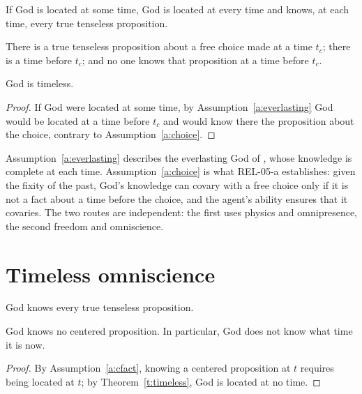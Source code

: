 \documentclass{situationist-preprint}
\begin{document}
\begin{assumption}\label{a:everlasting}
If God is located at some time, God is located at every time and knows, at each time, every true tenseless proposition.
\end{assumption}

\begin{assumption}\label{a:choice}
There is a true tenseless proposition about a free choice made at a time $t_c$; there is a time before $t_c$; and no one knows that proposition at a time before $t_c$.
\end{assumption}

\begin{proposition}\label{p:second}
God is timeless.
\end{proposition}

\begin{proof}
If God were located at some time, by Assumption~\ref{a:everlasting} God would be located at a time before $t_c$ and would know there the proposition about the choice, contrary to Assumption~\ref{a:choice}.
\end{proof}

Assumption~\ref{a:everlasting} describes the everlasting God of \citet{Wolterstorff1975}, whose knowledge is complete at each time. Assumption~\ref{a:choice} is what REL-05-a establishes: given the fixity of the past, God's knowledge can covary with a free choice only if it is not a fact about a time before the choice, and the agent's ability ensures that it covaries. The two routes are independent: the first uses physics and omnipresence, the second freedom and omniscience.

\section{Timeless omniscience}

\begin{assumption}\label{a:tenseless}
God knows every true tenseless proposition.
\end{assumption}

\begin{corollary}\label{c:noindex}
God knows no centered proposition. In particular, God does not know what time it is now.
\end{corollary}

\begin{proof}
By Assumption~\ref{a:cfact}, knowing a centered proposition at $t$ requires being located at $t$; by Theorem~\ref{t:timeless}, God is located at no time.
\end{proof}
\end{document}
